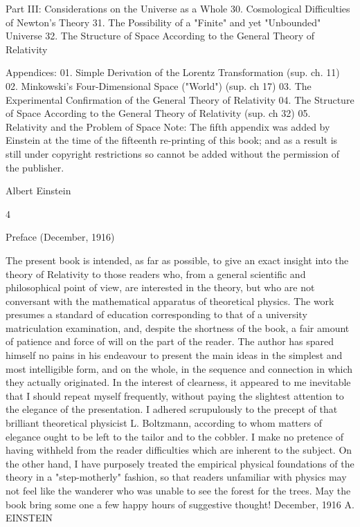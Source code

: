 \documentclass{article}
\begin{document}
Part III: Considerations on the Universe as a Whole
30. Cosmological Difficulties of Newton's Theory
31. The Possibility of a "Finite" and yet "Unbounded" Universe
32. The Structure of Space According to the General Theory of Relativity

Appendices:
01. Simple Derivation of the Lorentz Transformation (sup. ch. 11)
02. Minkowski's Four-Dimensional Space ("World") (sup. ch 17)
03. The Experimental Confirmation of the General Theory of Relativity
04. The Structure of Space According to the General Theory of Relativity (sup. ch
32)
05. Relativity and the Problem of Space
Note: The fifth appendix was added by Einstein at the time of the fifteenth re-printing of this book; and
as a result is still under copyright restrictions so cannot be added without the permission of the publisher.

Albert Einstein

4

Preface
(December, 1916)

The present book is intended, as far as possible, to give an exact insight into the theory of
Relativity to those readers who, from a general scientific and philosophical point of view,
are interested in the theory, but who are not conversant with the mathematical apparatus of
theoretical physics. The work presumes a standard of education corresponding to that of a
university matriculation examination, and, despite the shortness of the book, a fair amount
of patience and force of will on the part of the reader. The author has spared himself no
pains in his endeavour to present the main ideas in the simplest and most intelligible form,
and on the whole, in the sequence and connection in which they actually originated. In the
interest of clearness, it appeared to me inevitable that I should repeat myself frequently,
without paying the slightest attention to the elegance of the presentation. I adhered
scrupulously to the precept of that brilliant theoretical physicist L. Boltzmann, according to
whom matters of elegance ought to be left to the tailor and to the cobbler. I make no
pretence of having withheld from the reader difficulties which are inherent to the subject.
On the other hand, I have purposely treated the empirical physical foundations of the theory
in a "step-motherly" fashion, so that readers unfamiliar with physics may not feel like the
wanderer who was unable to see the forest for the trees. May the book bring some one a few
happy hours of suggestive thought!
December, 1916
A. EINSTEIN
\end{document}

